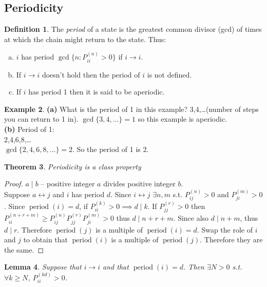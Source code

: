 \documentclass{article}
\newtheorem{thm}{Theorem}
\newtheorem{lem}[thm]{Lemma}
\theoremstyle{definition}
\newtheorem{defn}[thm]{Definition}
\newtheorem{ex}[thm]{Example}
\begin{document}
\subsection{Periodicity}
\begin{defn}
The \emph{period} of a state is the greatest common divisor (gcd) of times at which the chain might return to the state. Thus:
\begin{enumerate}[(a)]
\item $i$ has period $\gcd\{n \colon P_{ii}^{(n)} > 0\}$ if $i \rightarrow i$.
\item If $i\rightarrow i$ doesn't hold then the period of $i$ is not defined.
\item If $i$ has period 1 then it is said to be aperiodic.
\end{enumerate}
\end{defn}

\begin{ex}
\textbf{(a)}
What is the period of 1 in this example? 3,4,\ldots (number of steps you can return to 1 in).
$\gcd\{3,4,\ldots\} = 1$ so this example is aperiodic.\\
\textbf{(b)}
Period of 1: \\
2,4,6,8,\ldots \\
$\gcd\{2,4,6,8,\ldots\} = 2$.
So the period of 1 is 2.
\end{ex}

\begin{thm} Periodicity is a class property \end{thm}
\begin{proof}
$a\mid b$ -- positive integer $a$ divides positive integer $b$. \\
Suppose $a\leftrightarrow j$ and $i$ has period $d$.
Since $i\leftrightarrow j$ $\exists n,m$ s.t. $P_{ij}^{(n)} > 0$ and $P_{ji}^{(m)}>0$.
Since $\operatorname{period}(i) = d$, if $P_{ii}^{(k)}>0 \implies d\mid k$.
If $P_{jj}^{(r)}> 0$ then $P_{ii}^{(n+r+m)} \ge P_{ij}^{(n)}P_{jj}^{(r)}P_{ji}^{(m)}>0$ thus $d\mid n+r+m$.
Since also $d\mid n+m$, thus $d\mid r$.
Therefore $\operatorname{period}(j)$ is a multiple of $\operatorname{period}(i) = d$.
Swap the role of $i$ and $j$ to obtain that $\operatorname{period}(i)$ is a multiple of $\operatorname{period}(j)$.
Therefore they are the same.
\end{proof}

\begin{lem}
Suppose that $i\rightarrow i$ and that $\operatorname{period}(i) = d$.
Then $\exists N>0$ s.t. $\forall k\ge N$, $P_{ii}^{(kd)} >0$.
\end{lem}
\end{document}
